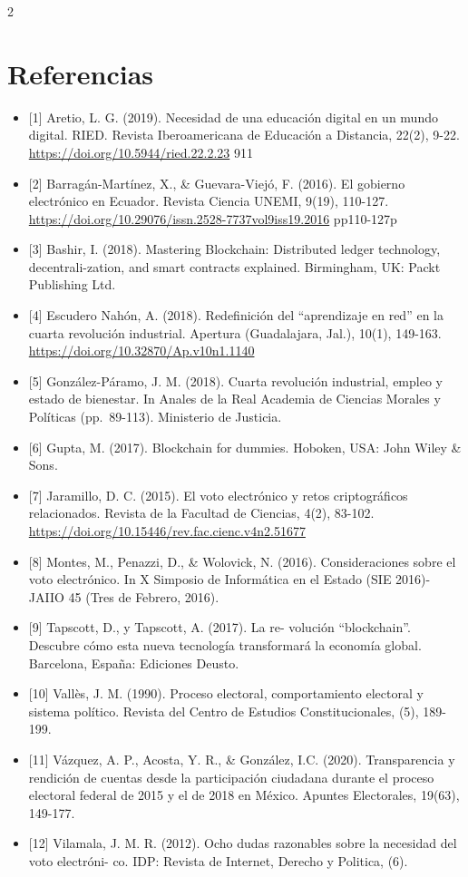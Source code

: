 \documentclass[12pt,spanish,Letterpaper,openany]{book}
\begin{document}
\begin {multicols}{2}
\hypertarget{referencias-4}{%
\section{Referencias}\label{referencias-4}}

\begin{itemize}
\item
  {[}1{]} Aretio, L. G. (2019). Necesidad de una educación digital en un mundo digital. RIED. Revista Iberoamericana de Educación a Distancia, 22(2), 9-22. \url{https://doi.org/10.5944/ried.22.2.23}
  911
\item
  {[}2{]} Barragán-Martínez, X., \& Guevara-Viejó, F. (2016). El gobierno electrónico en Ecuador. Revista Ciencia UNEMI, 9(19), 110-127. \url{https://doi.org/10.29076/issn.2528-7737vol9iss19.2016}
  pp110-127p
\item
  {[}3{]} Bashir, I. (2018). Mastering Blockchain: Distributed ledger technology, decentrali-zation, and smart contracts explained. Birmingham, UK: Packt Publishing Ltd.
\item
  {[}4{]} Escudero Nahón, A. (2018). Redefinición del ``aprendizaje en red'' en la cuarta revolución industrial. Apertura (Guadalajara, Jal.), 10(1), 149-163. \url{https://doi.org/10.32870/Ap.v10n1.1140}
\item
  {[}5{]} González-Páramo, J. M. (2018). Cuarta revolución industrial, empleo y estado de bienestar. In Anales de la Real Academia de Ciencias Morales y Políticas (pp.~89-113). Ministerio de Justicia.
\item
  {[}6{]} Gupta, M. (2017). Blockchain for dummies. Hoboken, USA: John Wiley \& Sons.
\item
  {[}7{]} Jaramillo, D. C. (2015). El voto electrónico y retos criptográficos relacionados. Revista de la Facultad de Ciencias, 4(2), 83-102. \url{https://doi.org/10.15446/rev.fac.cienc.v4n2.51677}
\item
  {[}8{]} Montes, M., Penazzi, D., \& Wolovick, N. (2016). Consideraciones sobre el voto electrónico. In X Simposio de Informática en el Estado (SIE 2016)-JAIIO 45 (Tres de Febrero, 2016).
\item
  {[}9{]} Tapscott, D., y Tapscott, A. (2017). La re-
  volución ``blockchain''. Descubre cómo esta nueva tecnología transformará la economía global. Barcelona, España: Ediciones Deusto.
\item
  {[}10{]} Vallès, J. M. (1990). Proceso electoral, comportamiento electoral y sistema político. Revista del Centro de Estudios Constitucionales, (5), 189-199.
\item
  {[}11{]} Vázquez, A. P., Acosta, Y. R., \& González, I.C. (2020). Transparencia y rendición de cuentas desde la participación ciudadana durante el proceso electoral federal de 2015 y el de 2018 en México. Apuntes Electorales, 19(63), 149-177.
\item
  {[}12{]} Vilamala, J. M. R. (2012). Ocho dudas razonables sobre la necesidad del voto electróni-
  co. IDP: Revista de Internet, Derecho y Politica, (6).
\end{itemize}


\end{multicols}
\end{document}

